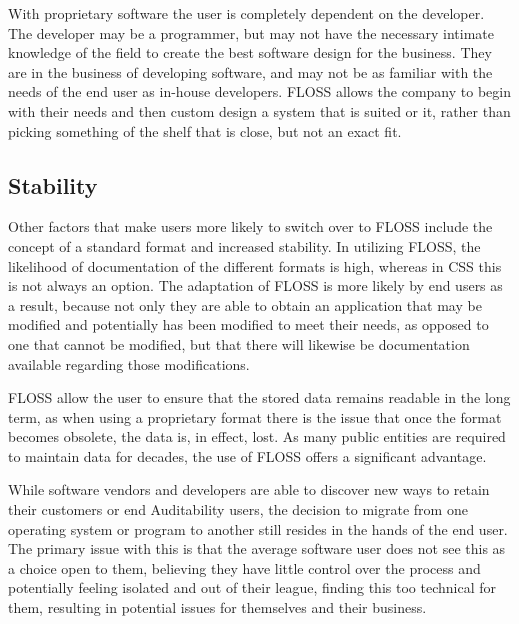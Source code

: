  With proprietary software the user is completely dependent on the developer. The developer may be a programmer, but may not have the necessary intimate knowledge of the field to create the best software design for the business. They are in the business of developing software, and may not be as familiar with the needs of the end user as in-house developers. FLOSS allows the company to begin with their needs and then custom design a system that is suited or it, rather than picking something of the shelf that is close, but not an exact fit. 

  \subsection {Stability} 

  Other factors that make users more likely to switch over to FLOSS include the concept of a standard format and increased stability. In utilizing FLOSS, the likelihood of documentation of the different formats is high, whereas in CSS  this is not always an option. The adaptation of FLOSS is more likely by end users as a result, because not only they are able to obtain an application that may be modified and potentially has been modified to meet their needs, as opposed to one that cannot be modified, but that there will likewise be documentation available regarding those modifications. 

  FLOSS allow the user to ensure that the stored data remains readable in the long term, as when using a proprietary format there is the issue that once the format becomes obsolete, the data is, in effect, lost. As many public entities are required to maintain data for decades, the use of FLOSS offers a significant advantage.

  While software vendors and developers are able to discover new ways to retain their customers or end Auditability users, the decision to migrate from one operating system or program to another still resides in the hands of the end user. The primary issue with this is that the average software user does not see this as a choice open to them, believing they have little control over the process and potentially feeling isolated and out of their league, finding this too technical for them, resulting in potential issues for themselves and their business.
 
